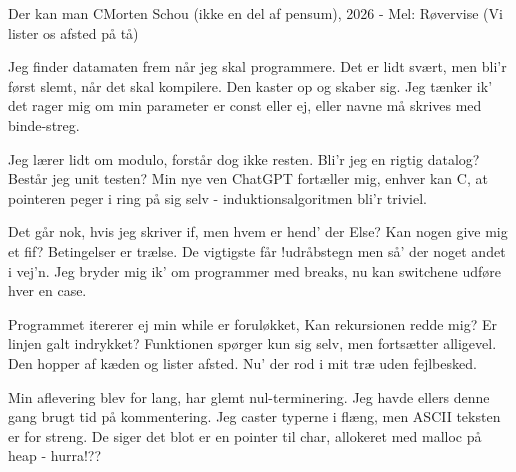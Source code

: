 \begin{sang}{Der kan man C}{Morten Schou (ikke en del af pensum), 2026 - Mel: Røvervise (Vi lister os afsted på tå)}
\begin{vers}
Jeg finder datamaten frem
når jeg skal programmere.
Det er lidt svært, men bli'r først slemt,
når det skal kompilere.
Den kaster op og skaber sig.
Jeg tænker ik' det rager mig
om min parameter er const eller ej,
eller navne må skrives med binde-streg.
\end{vers}
\begin{vers}
Jeg lærer lidt om modulo,
forstår dog ikke resten.
Bli'r jeg en rigtig datalog?
Består jeg unit testen?
Min nye ven ChatGPT
fortæller mig, enhver kan C,
at pointeren peger i ring på sig selv -
induktionsalgoritmen bli'r triviel.
\end{vers}
\begin{vers}
Det går nok, hvis jeg skriver if,
men hvem er hend' der Else?
Kan nogen give mig et fif?
Betingelser er trælse.
De vigtigste får !udråbstegn
men så' der noget andet i vej'n.
Jeg bryder mig ik' om programmer med breaks,
nu kan switchene udføre hver en case.
\end{vers}
\begin{vers}
Programmet itererer ej
min while er foruløkket,
Kan rekursionen redde mig?
Er linjen galt indrykket?
Funktionen spørger kun sig selv,
men fortsætter alligevel.
Den hopper af kæden og lister afsted.
Nu' der rod i mit træ uden fejlbesked.
\end{vers}
\begin{vers}
Min aflevering blev for lang,
har glemt nul-terminering.
Jeg havde ellers denne gang
brugt tid på kommentering.
Jeg caster typerne i flæng,
men ASCII teksten er for streng.
De siger det blot er en pointer til char,
allokeret med malloc på heap - hurra!??
\end{vers}
\vbox{}\vfill
\vbox{}\vfill
\vbox{}\vfill
\vbox{}\vfill
\vbox{}\vfill
\vbox{}\vfill
\vbox{}\vfill
\laps
\end{sang}